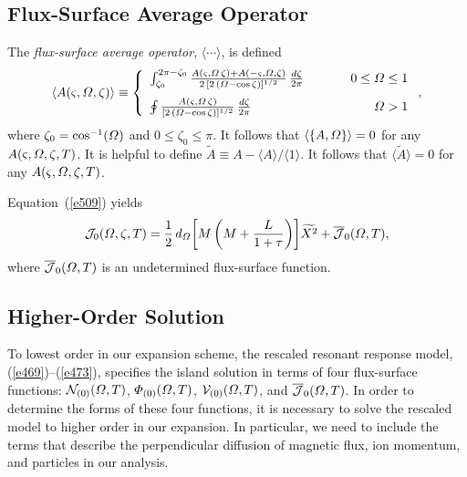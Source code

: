 \documentclass[12pt,prb,aps]{revtex4-1}
\begin{document}
\subsection{Flux-Surface Average Operator}
The {\em flux-surface average operator}, $\langle\cdots\rangle$, is defined\,\cite{rutherford}
\begin{equation}
\langle A(\varsigma,{\mit\Omega},\zeta)\rangle
\equiv \left\{
\begin{array}{llr}
\int_{\zeta_0}^{2\pi-\zeta_0}\frac{A(\varsigma,{\mit\Omega}\,\zeta)+A(-\varsigma,{\mit\Omega},\zeta)}{2\,[2\,({\mit\Omega}-\cos\zeta)]^{1/2}}\,\frac{d\zeta}{2\pi}&~~~~~&0\leq {\mit\Omega}\leq 1\\[2ex]
\oint \frac{A(\varsigma,{\mit\Omega}\,\zeta)}{[2\,({\mit\Omega}-\cos\zeta)]^{1/2}}\,\frac{d\zeta}{2\pi}
&&{\mit\Omega}> 1
\end{array}
\right.,
\end{equation}
where $\zeta_0=\cos^{-1}({\mit\Omega})$ and $0\leq\zeta_0\leq\pi$. 
It follows that
$\langle\{A,{\mit\Omega}\}\rangle = 0$
for any $A(\varsigma,{\mit\Omega},\zeta,T)$. It is helpful to define
$\tilde{A}  \equiv A - \langle A\rangle/\langle 1\rangle$.
It follows that 
$\langle \tilde{A}\rangle =0$
 for any $A(\varsigma,{\mit\Omega},\zeta,T)$.

Equation~(\ref{e509}) yields 
\begin{equation}\label{e513}
{\cal J}_0({\mit\Omega},\zeta,T)= 
\frac{1}{2}\,d_{\mit\Omega}\!\left[M\left(M+\frac{L}{1+\tau}\right)\right]\!\widetilde{X^2} + \overline{\cal J}_0({\mit\Omega},T),
\end{equation}
where $\overline{{\cal J}}_0({\mit\Omega},T)$ is an undetermined flux-surface function. 

\subsection{Higher-Order Solution}
To lowest order in our expansion scheme, the rescaled resonant response model, (\ref{e469})--(\ref{e473}), specifies the
island solution in terms of four flux-surface functions: 
 ${\cal N}_{(0)}({\mit\Omega},T)$,
${\mit\Phi}_{(0)}({\mit\Omega},T)$,  ${\cal V}_{(0)}({\mit\Omega},T)$, and $\overline{\cal J}_0({\mit\Omega},T)$. In order to determine
the forms of these  four  functions,  it is necessary to solve the rescaled model to higher order in our expansion. In particular,
we need to include the terms that describe the perpendicular diffusion of magnetic flux, ion momentum, and
particles in our analysis.  
\end{document}
